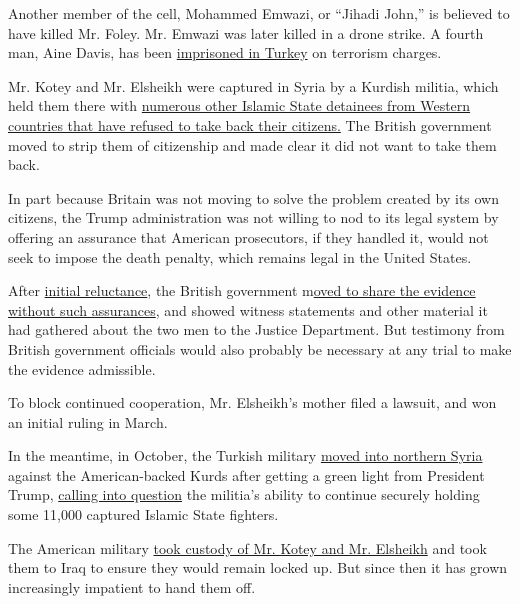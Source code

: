 Another member of the cell, Mohammed Emwazi, or ``Jihadi John,'' is
believed to have killed Mr. Foley. Mr. Emwazi was later killed in a
drone strike. A fourth man, Aine Davis, has been
\href{https://www.theguardian.com/world/2017/may/09/british-jihadist-aine-davis-convicted-in-turkey-on-terror-charges}{imprisoned
in Turkey} on terrorism charges.

Mr. Kotey and Mr. Elsheikh were captured in Syria by a Kurdish militia,
which held them there with
\href{https://www.nytimes.com/2018/07/18/world/middleeast/islamic-state-detainees-syria-prisons.html?action=click\&module=RelatedCoverage\&pgtype=Article\&region=Footer}{numerous
other Islamic State detainees from Western countries that have refused
to take back their citizens.} The British government moved to strip them
of citizenship and made clear it did not want to take them back.

In part because Britain was not moving to solve the problem created by
its own citizens, the Trump administration was not willing to nod to its
legal system by offering an assurance that American prosecutors, if they
handled it, would not seek to impose the death penalty, which remains
legal in the United States.

After
\href{https://www.nytimes.com/2018/02/28/us/politics/britain-death-penalty-isis.html}{initial
reluctance}, the British government
m\href{https://www.nytimes.com/2019/01/18/us/politics/british-isis-prosecution-beatles.html}{oved
to share the evidence without such assurances}, and showed witness
statements and other material it had gathered about the two men to the
Justice Department. But testimony from British government officials
would also probably be necessary at any trial to make the evidence
admissible.

To block continued cooperation, Mr. Elsheikh's mother filed a lawsuit,
and won an initial ruling in March.

In the meantime, in October, the Turkish military
\href{https://www.nytimes.com/2019/10/09/world/middleeast/turkey-attacks-syria.html}{moved
into northern Syria} against the American-backed Kurds after getting a
green light from President Trump,
\href{https://www.nytimes.com/2019/10/07/us/politics/isis-prisons-detainees.html?}{calling
into question} the militia's ability to continue securely holding some
11,000 captured Islamic State fighters.

The American military
\href{https://www.nytimes.com/2019/10/09/us/politics/beatles-isis-us-custody.html}{took
custody of Mr. Kotey and Mr. Elsheikh} and took them to Iraq to ensure
they would remain locked up. But since then it has grown increasingly
impatient to hand them off.

